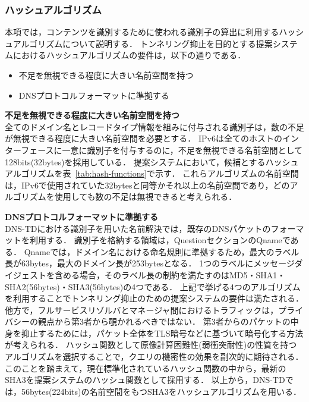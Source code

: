 \subsubsection{ハッシュアルゴリズム}
本項では，コンテンツを識別するために使われる識別子の算出に利用するハッシュアルゴリズムについて説明する．
トンネリング抑止を目的とする提案システムにおけるハッシュアルゴリズムの要件は，以下の通りである．
\begin{itemize}
 \item 不足を無視できる程度に大きい名前空間を持つ
 \vspace{-3mm}
 \item DNSプロトコルフォーマットに準拠する
\end{itemize}

\hspace{-12pt}\textbf{不足を無視できる程度に大きい名前空間を持つ}\\
\hspace{12pt}全てのドメイン名とレコードタイプ情報を組みに付与される識別子は，数の不足が無視できる程度に大きい名前空間を必要とする．
IPv6は全てのホストのインターフェースに一意に識別子を付与するのに，不足を無視できる名前空間として128bits(32bytes)を採用している．
提案システムにおいて，候補とするハッシュアルゴリズムを表~\ref{tab:hash-functions}で示す．
これらアルゴリズムの名前空間は，IPv6で使用されていた32bytesと同等かそれ以上の名前空間であり，どのアルゴリズムを使用しても数の不足は無視できると考えられる．


\hspace{-12pt}\textbf{DNSプロトコルフォーマットに準拠する}\\
\hspace{12pt}DNS-TDにおける識別子を用いた名前解決では，既存のDNSパケットのフォーマットを利用する．
識別子を格納する領域は，QuestionセクションのQnameである．
Qnameでは，ドメイン名における命名規則に準拠するため，最大のラベル長が63bytes，最大のドメイン長が253bytesとなる．
1つのラベルにメッセージダイジェストを含める場合，そのラベル長の制約を満たすのはMD5・SHA1・SHA2(56bytes)・SHA3(56bytes)の4つである．
上記で挙げる4つのアルゴリズムを利用することでトンネリング抑止のための提案システムの要件は満たされる．
他方で，フルサービスリゾルバとマネージャ間におけるトラフィックは，プライバシーの観点から第3者から覗かれるべきではない．
第3者からのパケットの中身を抑止するためには，パケット全体をTLS暗号などに基づいて暗号化する方法が考えられる．
ハッシュ関数として原像計算困難性(弱衝突耐性)の性質を持つアルゴリズムを選択することで，クエリの機密性の効果を副次的に期待される．
このことを踏まえて，現在標準化されているハッシュ関数の中から，最新のSHA3を提案システムのハッシュ関数として採用する．
以上から，DNS-TDでは，56bytes(224bits)の名前空間をもつSHA3をハッシュアルゴリズムを用いる．

